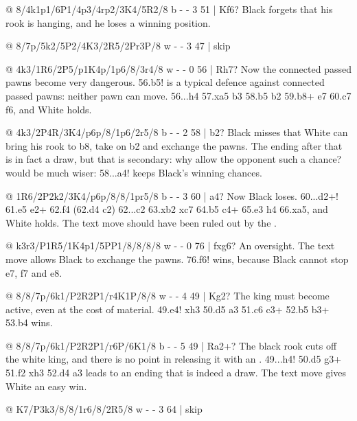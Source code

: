 @ 8/4k1p1/6P1/4p3/4rp2/3K4/5R2/8 b - - 3 51 | Kf6?
Black forgets that his rook is hanging, and he loses a winning position.

@ 8/7p/5k2/5P2/4K3/2R5/2Pr3P/8 w - - 3 47 | skip

@ 4k3/1R6/2P5/p1K4p/1p6/8/3r4/8 w - - 0 56 | Rh7?
Now the connected passed pawns become very dangerous. 56.\R b5! is a typical defence against
connected passed pawns: neither pawn can move. 56...h4 57.\R xa5 b3 58.\R b5 b2 59.\R b8+ \K e7
60.c7 \K f6, and White holds.

@ 4k3/2P4R/3K4/p6p/8/1p6/2r5/8 b - - 2 58 | b2?
 Black misses that White can bring his rook to b8,
take on b2 and exchange the pawns. The ending after that is in fact a draw, but that is
secondary: why allow the opponent such a chance?  would be much wiser:
58...a4! keeps Black's winning chances.

@ 1R6/2P2k2/3K4/p6p/8/8/1pr5/8 b - - 3 60 | a4?
Now Black loses. 60...\R d2+! 61.\K e5 \R e2+ 62.\K f4 (62.\K d4 \R c2) 62...\R c2 63.\R xb2
\R xc7 64.\R b5 \R c4+ 65.\K e3 h4 66.\R xa5, and White holds. The text move should have been
ruled out by the .

@ k3r3/P1R5/1K4p1/5PP1/8/8/8/8 w - - 0 76 | fxg6?
An oversight. The text move allows Black to exchange the pawns.
76.f6! wins, because Black cannot stop \R e7, f7 and \R e8.

@ 8/8/7p/6k1/P2R2P1/r4K1P/8/8 w - - 4 49 | Kg2?
The king must become active, even at the cost of material.
49.\K e4! \R xh3 50.\K d5 \R a3 51.\K c6 \R c3+ 52.\K b5 \R b3+ 53.\R b4 wins.

@ 8/8/7p/6k1/P2R2P1/r6P/6K1/8 b - - 5 49 | Ra2+?
The black rook cuts off the white king, and there is no point in releasing it with an
.
49...\K h4! 50.\R d5 \R g3+ 51.\K f2 \K xh3 52.\R d4 \R a3 leads to an ending that is indeed a
draw. The text move gives White an easy win.

@ K7/P3k3/8/8/1r6/8/2R5/8 w - - 3 64 | skip

